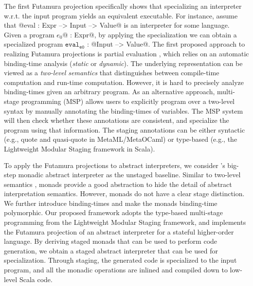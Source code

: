 The first Futamura projection specifically shows that specializing an
interpreter w.r.t. the input program yields an equivalent executable. For
instance, assume that @eval : Expr --> Input --> Value@ is an interpreter for some language.
Given a program $e_0$@ : Expr@, by applying the specialization we can
obtain a specialized program $\texttt{eval}_{\texttt{e0}}$ : @Input --> Value@.
The first proposed approach to realizing Futamura projections is partial
evaluation \cite{DBLP:books/daglib/0072559}, which relies on an automatic
binding-time analysis (\textit{static} or \textit{dynamic}).  The underlying
representation can be viewed as a \textit{two-level semantics}
\cite{NIELSON1989117, NIELSON198859} that distinguishes between compile-time
computation and run-time computation.
However, it is hard to precisely analyze binding-times given an arbitrary
program. As an alternative approach, multi-stage programming (MSP)
\cite{taha1999multi, DBLP:conf/pepm/TahaS97} allows users to explicitly program
over a two-level syntax \cite{Nielson:1992:TFL:130665} by manually annotating
the binding-times of variables. The MSP system will then check whether these
annotations are consistent, and specialize the program using that information.
The staging annotations can be either syntactic (e.g., quote and quasi-quote in
MetaML/MetaOCaml) or type-based (e.g., the Lightweight Modular Staging framework
\cite{DBLP:conf/gpce/RompfO10} in Scala).

To apply the Futamura projections to abstract interpreters, we consider
\citet{DBLP:journals/pacmpl/DaraisLNH17}'s big-step monadic abstract interpreter
as the unstaged baseline.  Similar to two-level semantics \cite{NIELSON1989117},
monads provide a good abstraction to hide the detail of abstract interpretation
semantics. However, monads do not have a clear stage distinction. We further
introduce binding-times and make the monads binding-time polymorphic. Our
proposed framework adopts the type-based multi-stage programming from the
Lightweight Modular Staging framework, and implements the Futamura projection of
an abstract interpreter for a stateful higher-order language. By deriving staged
monads that can be used to perform code generation, we obtain a staged abstract
interpreter that can be used for specialization. Through staging, the generated
code is specialized to the input program, and all the monadic operations are
inlined and compiled down to low-level Scala code.

